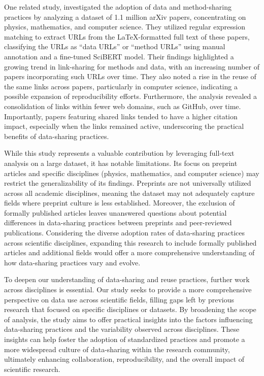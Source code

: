 One related study, \cite{cao_rise_2023} investigated the adoption of data and method-sharing practices by analyzing a dataset of 1.1 million arXiv papers, concentrating on physics, mathematics, and computer science. They utilized regular expression matching to extract URLs from the LaTeX-formatted full text of these papers, classifying the URLs as ``data URLs'' or ``method URLs'' using manual annotation and a fine-tuned SciBERT model. Their findings highlighted a growing trend in link-sharing for methods and data, with an increasing number of papers incorporating such URLs over time. They also noted a rise in the reuse of the same links across papers, particularly in computer science, indicating a possible expansion of reproducibility efforts. Furthermore, the analysis revealed a consolidation of links within fewer web domains, such as GitHub, over time. Importantly, papers featuring shared links tended to have a higher citation impact, especially when the links remained active, underscoring the practical benefits of data-sharing practices.

While this study represents a valuable contribution by leveraging full-text analysis on a large dataset, it has notable limitations. Its focus on preprint articles and specific disciplines (physics, mathematics, and computer science) may restrict the generalizability of its findings. Preprints are not universally utilized across all academic disciplines, meaning the dataset may not adequately capture fields where preprint culture is less established. Moreover, the exclusion of formally published articles leaves unanswered questions about potential differences in data-sharing practices between preprints and peer-reviewed publications. Considering the diverse adoption rates of data-sharing practices across scientific disciplines, expanding this research to include formally published articles and additional fields would offer a more comprehensive understanding of how data-sharing practices vary and evolve.


To deepen our understanding of data-sharing and reuse practices, further work across disciplines is essential. Our study seeks to provide a more comprehensive perspective on data use across scientific fields, filling gaps left by previous research that focused on specific disciplines or datasets. By broadening the scope of analysis, the study aims to offer practical insights into the factors influencing data-sharing practices and the variability observed across disciplines. These insights can help foster the adoption of standardized practices and promote a more widespread culture of data-sharing within the research community, ultimately enhancing collaboration, reproducibility, and the overall impact of scientific research.